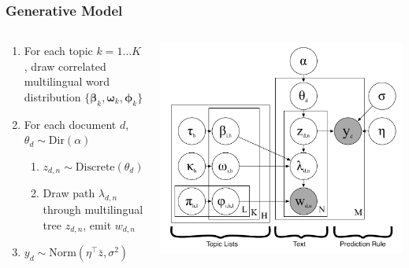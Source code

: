 \frame
{
  \frametitle{Generative Model}

\begin{columns}


\begin{block}{}
\begin{enumerate}
	\item For each topic $k = 1 \dots K$, \alert<2>{draw correlated multilingual word distribution $\{{\bm \beta}_k, {\bm \omega}_k, {\bm \phi}_k\}$}
	\item For each document $d$, $\theta_d \sim \mbox{Dir}(\alpha)$
	\begin{enumerate}
	\item $z_{d,n} \sim \mbox{Discrete}(\theta_d)$
	\item \alert<3> {Draw path $\lambda_{d,n}$ through multilingual tree $z_{d,n}$, emit $w_{d,n}$}
	\end{enumerate}
	\item $y_d \sim \mbox{Norm}(\eta^{\top} \bar{z}, \sigma^2)$
\end{enumerate}
\end{block}


\begin{center}
\includegraphics[width=0.9\linewidth]{mlslda/mlslda}
\end{center}

\end{columns}

}

